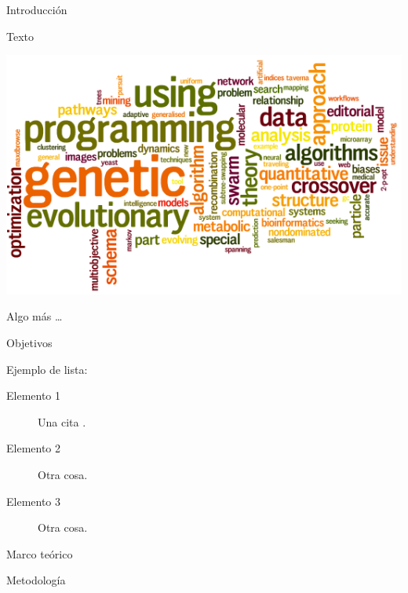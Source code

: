 \documentclass[a0paper, portrait]{baposter}
\begin{document}
\begin{poster}

  \begin{posterbox}[name=intro, column=0, row=0]{Introducci\'on} {
    Texto
    
    \includegraphics[width=\linewidth]{wordle2.png}
    \label{fig:1}
    
    \vspace{1em} Algo m\'as \ldots %
  }
  \end{posterbox}

  \begin{posterbox}[name=tech, column=0, below=intro]{Objetivos} {
    Ejemplo de lista: \newline
    \begin{description}
    \item[Elemento 1] Una cita \cite{Charras}. 
    \item[Elemento 2] Otra cosa.
    \item[Elemento 3] Otra cosa.
    \end{description}
  }
  \end{posterbox}

  \begin{posterbox}[name=initial, column=0, below=tech]{Marco te\'orico} {
    
  }
  \end{posterbox}

  \begin{posterbox}[name=semantic, column=1, row=0]{Metodolog\'ia} {
    
  }
  \end{posterbox}
  

\end{poster}
\end{document}
